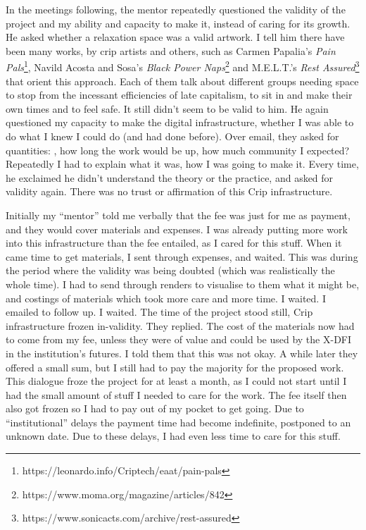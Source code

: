 In the meetings following, the mentor repeatedly questioned the validity
of the project and my ability and capacity to make it, instead of caring
for its growth. He asked whether a relaxation space was a valid artwork.
I tell him there have been many works, by crip artists and others, such
as Carmen Papalia's \emph{Pain Pals}\footnote{https://leonardo.info/Criptech/eaat/pain-pals},
Navild Acosta and Sosa's \emph{Black Power Naps}\footnote{https://www.moma.org/magazine/articles/842}
and M.E.L.T.'s \emph{Rest Assured}\footnote{https://www.sonicacts.com/archive/rest-assured}
that orient this approach. Each of them talk about different groups
needing space to stop from the incessant efficiencies of late
capitalism, to sit in and make their own times and to feel safe. It
still didn't seem to be valid to him. He again questioned my capacity to
make the digital infrastructure, whether I was able to do what I knew I
could do (and had done before). Over email, they asked for quantities: ,
how long the work would be up, how much community I expected? Repeatedly
I had to explain what it was, how I was going to make it. Every time, he
exclaimed he didn't understand the theory or the practice, and asked for
validity again. There was no trust or affirmation of this Crip
infrastructure.

Initially my ``mentor'' told me verbally that the fee was just for me as
payment, and they would cover materials and expenses. I was already
putting more work into this infrastructure than the fee entailed, as I
cared for this stuff. When it came time to get materials, I sent through
expenses, and waited. This was during the period where the validity was
being doubted (which was realistically the whole time). I had to send
through renders to visualise to them what it might be, and costings of
materials which took more care and more time. I waited. I emailed to
follow up. I waited. The time of the project stood still, Crip
infrastructure frozen in-validity. They replied. The cost of the
materials now had to come from my fee, unless they were of value and
could be used by the X-DFI in the institution's futures. I told them
that this was not okay. A while later they offered a small sum, but I
still had to pay the majority for the proposed work. This dialogue froze
the project for at least a month, as I could not start until I had the
small amount of stuff I needed to care for the work. The fee itself then
also got frozen so I had to pay out of my pocket to get going. Due to
``institutional'' delays the payment time had become indefinite,
postponed to an unknown date. Due to these delays, I had even less time
to care for this stuff.

